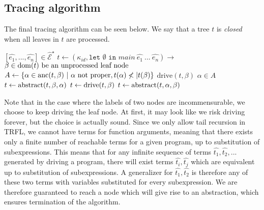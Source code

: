 \documentclass[10pt]{../sigplanconf}
\newcommand{\dom}{\ensuremath{{\rm dom}}}
\newcommand{\anc}{\ensuremath{{\rm anc}}}
\newcommand{\gen}{\ensuremath{~{\leq\kern-6pt \raisebox{1pt}{$\cdot$}}~}}
\begin{document}
\subsection{Tracing algorithm}
The final tracing algorithm can be seen below. We say that a tree $t$
is \emph{closed} when all leaves in $t$ are processed.
\begin{algorithmic}
   $[\widehat{e_1}, ..., \widehat{e_n}] \in \widehat{\mathcal{E}}^\star$
  \STATE $t\gets (\kappa_{id}, \texttt{let $\emptyset$ in $main~\widehat{e_1}~...~\widehat{e_n}$})\rightarrow$
    $\beta\in\dom(t) \text{ be an unprocessed leaf node}$
    \STATE $A\gets\{ \alpha\in\anc(t,\beta) ~|~ \alpha\text{ not proper}, t(\alpha) \not<| t(\beta)  \}$
      \STATE $\textrm{drive}(t,\beta)$
    \ELSE
      $\alpha \in A$
      \IF{$t_\mathcal{L}(\alpha) \gen t_\mathcal{L}(\beta)$}
       \STATE $t\gets {\rm abstract}(t,\beta,\alpha)$
        \STATE $t\gets {\rm drive}(t,\beta)$
      \ELSE
        \STATE $t\gets {\rm abstract}(t,\alpha,\beta)$
      \ENDIF
    \ENDIF
  \ENDWHILE
\end{algorithmic}

Note that in the case where the labels of two nodes are
incommensurable, we choose to keep driving the leaf node. At first, it
may look like we risk driving forever, but the choice is actually
sound. Since we only allow tail recursion in TRFL, we cannot have
terms for function arguments, meaning that there exists only a finite
number of reachable terms for a given program, up to substitution of
subexpressions. This means that for any infinite sequence of terms
$\widehat{t_1},\widehat{t_2},...$ generated by driving a program,
there will exist terms $\widehat{t_i},\widehat{t_j}$ which are
equivalent up to substitution of subexpressions. A generalizer for
$\widehat{t_1},\widehat{t_2}$ is therefore any of these two terms with
variables substituted for every subexpression. We are therefore
guaranteed to reach a node which will give rise to an abstraction,
which ensures termination of the algorithm.

\end{document}
